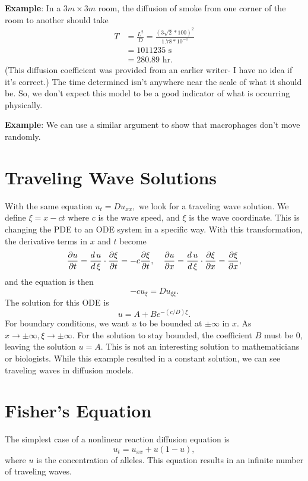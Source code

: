 \documentclass[]{article}
\numberwithin{equation}{section}		%
\newcommand{\parD}[2]{\frac{\partial #1}{\partial #2}}
\begin{document}
\noindent \textbf{Example}: In a $3m \times 3m$ room, the diffusion of smoke from one corner of the room to another should take 
\begin{align*}
T & =\frac{L^{2}}{D}=\frac{(3\sqrt{2}*100)^{2}}{1.78*10^{-1}}\\
 & =1011235\textrm{ s}\\
 & =280.89\textrm{ hr}.
\end{align*}(This diffusion coefficient was provided from an earlier writer- I have no idea if it's correct.) The time determined isn't anywhere near the scale of what it should be. So, we don't expect this model to be a good indicator of what is occurring physically. 

\noindent \textbf{Example}: We can use a similar argument to show that macrophages don't move randomly.


\section{Traveling Wave Solutions}
With the same equation $u_t = Du_{xx},$ we look for a traveling wave solution. We define $\xi = x-ct$ where $c$ is the wave speed, and $\xi$ is the wave coordinate. This is changing the PDE to an ODE system in a specific way. With this transformation, the derivative terms in $x$ and $t$ become
\begin{equation*}
\parD{u}{t} = \frac{d\,u}{d\,\xi}\cdot\parD{\xi}{t} = -c\parD{\xi}{t} , \hspace{.15in} \parD{u}{x} = \frac{d\,u}{d\,\xi} \cdot\parD{\xi}{x} = \parD{\xi}{x},
\end{equation*} and the equation is then
\begin{equation*}
-c u_\xi = Du_{\xi \xi}.
\end{equation*} The solution for this ODE is \begin{equation*}
u = A + Be^{-(c/D)\xi}.
\end{equation*} For boundary conditions, we want $u$ to be bounded at $\pm \infty$ in $x$. As $x\rightarrow \pm\infty, \xi\rightarrow \pm \infty.$ For the solution to stay bounded, the coefficient $B$ must be $0$, leaving the solution $u=A.$ This is not an interesting solution to mathematicians or biologists. While this example resulted in a constant solution, we can see traveling waves in diffusion models. 

\section{Fisher's Equation}
The simplest case of a nonlinear reaction diffusion equation is
\begin{equation}
	u_t=u_{xx}+u(1-u),
\end{equation} where $u$ is the concentration of alleles. This equation results in an infinite number of traveling waves.
\end{document}
